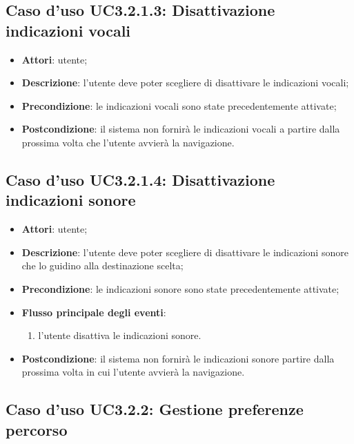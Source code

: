 \documentclass[../AnalisiDeiRequisiti.tex]{subfiles}
\begin{document}
\subsection{Caso d'uso UC3.2.1.3: Disattivazione indicazioni vocali}
\begin{itemize}
	\item \textbf{Attori}: utente;
	\item \textbf{Descrizione}: l'utente deve poter scegliere di disattivare le indicazioni vocali; 
	\item \textbf{Precondizione}: le indicazioni vocali sono state precedentemente attivate;
	\item \textbf{Postcondizione}: il sistema non fornirà le indicazioni vocali a partire dalla prossima volta che l'utente avvierà la navigazione.
\end{itemize}
\hypertarget{UC3.2.1.4}{}
\subsection{Caso d'uso UC3.2.1.4: Disattivazione indicazioni sonore}
\begin{itemize}
	\item \textbf{Attori}: utente;
	\item \textbf{Descrizione}: l'utente deve poter scegliere di disattivare le indicazioni sonore che lo guidino alla destinazione scelta; 
	\item \textbf{Precondizione}: le indicazioni sonore sono state precedentemente attivate;
	
	\item \textbf{Flusso principale degli eventi}:
	\begin{enumerate}
		\item l'utente disattiva le indicazioni sonore.
		
	\end{enumerate}
	\item \textbf{Postcondizione}: il sistema non fornirà le indicazioni sonore partire dalla prossima volta in cui l'utente avvierà la navigazione.
\end{itemize}
\hypertarget{UC3.2.2}{}
\subsection{Caso d'uso UC3.2.2: Gestione preferenze percorso}
\end{document}
